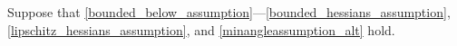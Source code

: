 Suppose that \cref{bounded_below_assumption}---\cref{bounded_hessians_assumption}, \cref{lipschitz_hessians_assumption}, and \cref{minangleassumption_alt} hold.
